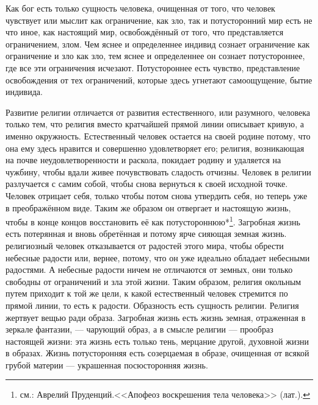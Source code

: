 \documentclass[12pt,oneside]{book}
\begin{document}
Как бог есть только сущность человека, очищенная от того, что человек чувствует или мыслит как ограничение, как зло, так и потусторонний мир есть не что иное, как настоящий мир, освобождённый от того, что представляется ограничением, злом. Чем яснее и определеннее индивид сознает ограничение как ограничение и зло как зло, тем яснее и определеннее он сознает потустороннее, где все эти ограничения исчезают. Потустороннее есть чувство, представление освобождения от тех ограничений, которые здесь угнетают самоощущение, бытие индивида. 

Развитие религии отличается от развития естественного, или разумного, человека только тем, что религия вместо кратчайшей прямой линии описывает кривую, а именно окружность. Естественный человек остается на своей родине потому, что она ему здесь нравится и совершенно удовлетворяет его; религия, возникающая на почве неудовлетворенности и раскола, покидает родину и удаляется на чужбину, чтобы вдали живее почувствовать сладость отчизны. Человек в религии разлучается с самим собой, чтобы снова вернуться к своей исходной точке. Человек отрицает себя, только чтобы потом снова утвердить себя, но теперь уже в преображённом виде. Таким же образом он отвергает и настоящую жизнь, чтобы в конце концов восстановить её как потустороннюю*\let\svthefootnote\thefootnote\let\thefootnote\relax{}\let\thefootnote\svthefootnote\footnote{см.: Аврелий Пруденций.<<Апофеоз воскрешения тела человека>> (лат.).}. Загробная жизнь есть потерянная и вновь обретённая и потому ярче сияющая земная жизнь. религиозный человек отказывается от радостей этого мира, чтобы обрести небесные радости или, вернее, потому, что он уже идеально обладает небесными радостями. А небесные радости ничем не отличаются от земных, они только свободны от ограничений и зла этой жизни. Таким образом, религия окольным путем приходит к той же цели, к какой естественный человек стремится по прямой линии, то есть к радости. Образность есть сущность религии. Религия жертвует вещью ради образа. Загробная жизнь есть жизнь земная, отраженная в зеркале фантазии, --- чарующий образ, а в смысле религии --- прообраз настоящей жизни: эта жизнь есть только тень, мерцание другой, духовной жизни в образах. Жизнь потусторонняя есть созерцаемая в образе, очищенная от всякой грубой материи --- украшенная посюсторонняя жизнь.
\end{document}
